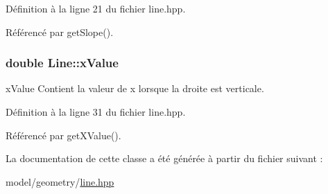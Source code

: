 Définition à la ligne 21 du fichier line.\+hpp.



Référencé par get\+Slope().

\hypertarget{classLine_af8b70928b9624988c1c42f33af93391a}{}
\subsubsection[{x\+Value}]{\setlength{\rightskip}{0pt plus 5cm}double Line\+::x\+Value\hspace{0.3cm}{\ttfamily [protected]}}\label{classLine_af8b70928b9624988c1c42f33af93391a}


x\+Value Contient la valeur de x lorsque la droite est verticale. 



Définition à la ligne 31 du fichier line.\+hpp.



Référencé par get\+X\+Value().



La documentation de cette classe a été générée à partir du fichier suivant \+:\begin{DoxyCompactItemize}
\item 
model/geometry/\hyperlink{line_8hpp}{line.\+hpp}\end{DoxyCompactItemize}
